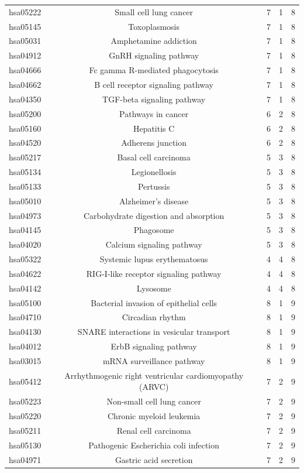 \documentclass[Minh_PhD_thesis.tex]{subfiles}
\begin{document}
\begin{center}
\begin{longtable}{@{}ccccc@{}}
hsa05222	&Small cell lung cancer&	7&	1&	8\\
hsa05145	&Toxoplasmosis&	7&	1&	8\\
hsa05031	&Amphetamine addiction&	7&	1&	8\\
hsa04912	&GnRH signaling pathway	&7&	1&	8\\
hsa04666	&Fc gamma R-mediated phagocytosis&	7&	1&	8\\
hsa04662	&B cell receptor signaling pathway&	7&	1&	8\\
hsa04350	&TGF-beta signaling pathway&	7&	1&	8\\
hsa05200	&Pathways in cancer&	6&	2&	8\\
hsa05160	&Hepatitis C&	6&	2&	8\\
hsa04520	&Adherens junction&	6&	2&	8\\
hsa05217	&Basal cell carcinoma&	5&	3&	8\\
hsa05134	&Legionellosis&	5&	3&	8\\
hsa05133	&Pertussis&	5&	3&	8\\
hsa05010	&Alzheimer's disease&	5&	3&	8\\
hsa04973	&Carbohydrate digestion and absorption&	5&	3&	8\\
hsa04145	&Phagosome&	5&	3&	8\\
hsa04020	&Calcium signaling pathway&	5&	3&	8\\
hsa05322	&Systemic lupus erythematosus&	4&	4&	8\\
hsa04622	&RIG-I-like receptor signaling pathway&	4&	4&	8\\
hsa04142	&Lysosome&	4&	4&	8\\
hsa05100	&Bacterial invasion of epithelial cells&	8&	1&	9\\
hsa04710	&Circadian rhythm&	8&	1&	9\\
hsa04130	&SNARE interactions in vesicular transport&	8&	1&	9\\
hsa04012	&ErbB signaling pathway&	8&	1&	9\\
hsa03015	&mRNA surveillance pathway&	8&	1&	9\\
hsa05412	&Arrhythmogenic right ventricular cardiomyopathy (ARVC)&	7&	2&	9\\
hsa05223	&Non-small cell lung cancer&	7&	2&	9\\
hsa05220	&Chronic myeloid leukemia&	7&	2&	9\\
hsa05211	&Renal cell carcinoma&	7&	2&	9\\
hsa05130	&Pathogenic Escherichia coli infection&	7&	2&	9\\
hsa04971	&Gastric acid secretion&	7&	2&	9\\

\end{longtable}
\end{center}
\end{document}
